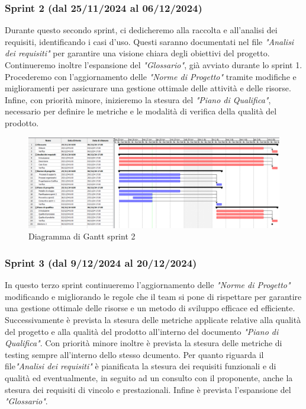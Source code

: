        \subsubsection{Sprint 2 (dal 25/11/2024 al 06/12/2024)}
        Durante questo secondo sprint, ci dedicheremo alla raccolta e all'analisi dei requisiti, identificando i 
        casi d'uso. Questi saranno documentati nel file \textit{"Analisi dei requisiti"} per garantire una visione 
        chiara degli obiettivi del progetto. Continueremo inoltre l'espansione del \textit{"Glossario"}, già 
        avviato durante lo sprint 1.  Procederemo con l'aggiornamento delle \textit{"Norme di Progetto"} tramite modifiche e miglioramenti per assicurare una gestione ottimale delle attività e delle risorse. Infine, con priorità minore, inizieremo la stesura del \textit{"Piano di Qualifica"}, necessario per definire le metriche e le modalità di 
        verifica della qualità del prodotto.

        
        \begin{figure}[h!]
            \centering
            \includegraphics[scale = 0.3]{template/images/gantt2.png}
            \caption{Diagramma di Gantt sprint 2}
            \label{fig:3.2} %
        \end{figure}


        \subsubsection{Sprint 3 (dal 9/12/2024 al 20/12/2024)}
        In questo terzo sprint continueremo l'aggiornamento delle \textit{"Norme di Progetto"} modificando e migliorando le regole che il team si pone di rispettare per garantire
        una gestione ottimale delle risorse e un metodo di sviluppo efficace ed efficiente. Successivamente è prevista la stesura delle metriche applicate relative alla qualità del progetto e alla qualità del prodotto all'interno del documento \textit{"Piano di Qualifica"}.
        Con priorità minore inoltre è prevista la stesura delle metriche di testing sempre all'interno dello stesso dcumento.
        Per quanto riguarda il file\textit{"Analisi dei requisiti"} è pianificata la stesura dei requisiti funzionali e di qualità ed eventualmente, in seguito ad un consulto con il proponente, anche la stesura dei requisiti di vincolo e prestazionali.
        Infine è prevista l'espansione del \textit{"Glossario"}.

